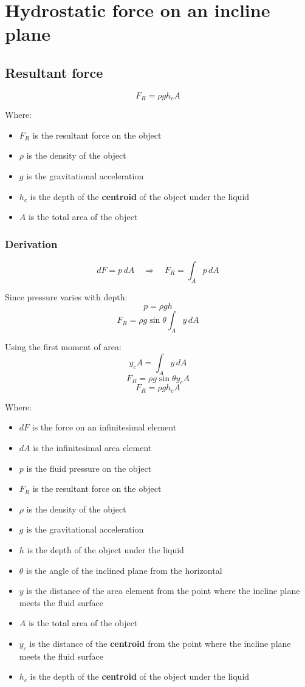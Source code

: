 \documentclass[11pt]{article}
\begin{document}
\newpage
\section{Hydrostatic force on an incline plane}
\label{sec:org3fb755e}

\subsection{Resultant force}
\label{sec:orgc9c1ccb}
\[F_R = \rho g h_c A\]

Where:
\begin{itemize}
\item \(F_R\) is the resultant force on the object
\item \(\rho\) is the density of the object
\item \(g\) is the gravitational acceleration
\item \(h_c\) is the depth of the \textbf{centroid} of the object under the liquid
\item \(A\) is the total area of the object
\end{itemize}

\newpage
\subsubsection{Derivation}
\label{sec:org35ec5bb}
\[dF = p \, dA \quad \Rightarrow \quad F_R = \int_A p \, dA\]

Since pressure varies with depth:
\[p = \rho g h\]
\[F_R = \rho g \sin \theta \int_A y \, dA\]

Using the first moment of area:
\[y_c A = \int_A y \, dA\]
\[F_R = \rho g \sin \theta y_c A\]
\[F_R = \rho g h_c A\]

Where:
\begin{itemize}
\item \(dF\) is the force on an infinitesimal element
\item \(dA\) is the infinitesimal area element
\item \(p\) is the fluid pressure on the object
\item \(F_R\) is the resultant force on the object
\item \(\rho\) is the density of the object
\item \(g\) is the gravitational acceleration
\item \(h\) is the depth of the object under the liquid
\item \(\theta\) is the angle of the inclined plane from the horizontal
\item \(y\) is the distance of the area element from the point where the incline plane meets the fluid surface
\item \(A\) is the total area of the object
\item \(y_c\) is the distance of the \textbf{centroid} from the point where the incline plane meets the fluid surface
\item \(h_c\) is the depth of the \textbf{centroid} of the object under the liquid
\end{itemize}
\end{document}
